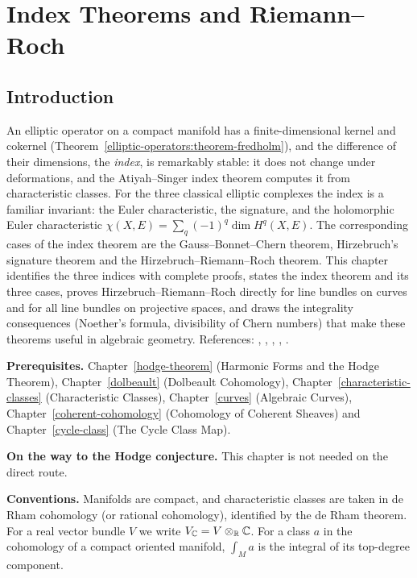 \chapter{Index Theorems and Riemann--Roch}\label{index-theorems}

\section{Introduction}\label{index-theorems:section-introduction}

An elliptic operator on a compact manifold has a finite-dimensional kernel and cokernel (Theorem~\ref{elliptic-operators:theorem-fredholm}), and the difference of their dimensions, the \emph{index}, is remarkably stable: it does
not change under deformations, and the Atiyah--Singer index theorem computes it from characteristic classes. For the three classical elliptic complexes the index is a familiar invariant: the Euler characteristic, the
signature, and the holomorphic Euler characteristic $\chi(X, E) = \sum_q(-1)^q\dim H^q(X, E)$. The corresponding cases of the index theorem are the Gauss--Bonnet--Chern theorem, Hirzebruch's signature theorem and the
Hirzebruch--Riemann--Roch theorem. This chapter identifies the three indices with complete proofs, states the index theorem and its three cases, proves Hirzebruch--Riemann--Roch directly for line bundles on curves and for
all line bundles on projective spaces, and draws the integrality consequences (Noether's formula, divisibility of Chern numbers) that make these theorems useful in algebraic geometry. References: \cite{hirzebruch-topological},
\cite{atiyah-singer-1968-1}, \cite{atiyah-singer-1968-3}, \cite{lawson-michelsohn}, \cite{griffiths-harris}.

\noindent\textbf{Prerequisites.} Chapter~\ref{hodge-theorem} (Harmonic Forms and the Hodge Theorem), Chapter~\ref{dolbeault} (Dolbeault Cohomology), Chapter~\ref{characteristic-classes} (Characteristic Classes),
Chapter~\ref{curves} (Algebraic Curves), Chapter~\ref{coherent-cohomology} (Cohomology of Coherent Sheaves) and Chapter~\ref{cycle-class} (The Cycle Class Map).

\noindent\textbf{On the way to the Hodge conjecture.} This chapter is not needed on the direct route.

\noindent\textbf{Conventions.} Manifolds are compact, and characteristic classes are taken in de Rham cohomology (or rational cohomology), identified by the de Rham theorem. For a real vector bundle $V$ we write
$V_{\mathbb{C}} = V \otimes_{\mathbb{R}} \mathbb{C}$. For a class $a$ in the cohomology of a compact oriented manifold, $\int_Ma$ is the integral of its top-degree component.

